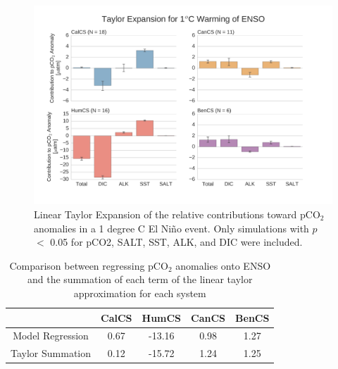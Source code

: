 \documentclass[12pt]{article}
\begin{document}
\clearpage
\begin{figure}[!h]
	\centering
	\includegraphics[width=\linewidth]{../../figs/all-systems/taylor_expansions/taylor-expansion-ENSO-pCO2-PVALUEREMOVED-smoothedClimate.png}
	\caption{Linear Taylor Expansion of the relative contributions toward pCO$_{2}$ anomalies in a 1 degree C El Ni\~no event. Only simulations with $p$ $<$ 0.05 for pCO2, SALT, SST, ALK, and DIC were included.}
	\label{fig:taylor-enso}
\end{figure}
\begin{table}[!h]
	\centering
\begin{tabular}{c | c c c c }
	& CalCS & HumCS & CanCS & BenCS \\
	\midrule
	Model Regression & 0.67 & -13.16 & 0.98 & 1.27 \\
	Taylor Summation & 0.12 & -15.72 & 1.24 & 1.25 \\
\end{tabular}
	\caption{Comparison between regressing pCO$_{2}$ anomalies onto ENSO and the summation of each term of the linear taylor approximation for each system}
	\label{tab:taylor-enso}
\end{table}
\end{document}
